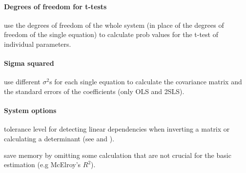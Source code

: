 \paragraph{Degrees of freedom for t-tests}   
 use the degrees of freedom of the whole system
   (in place of the degrees of freedom of the single equation)
   to calculate prob values for the t-test of individual parameters.

\paragraph{Sigma squared}   
 use different $\sigma^2$s for each
   single equation to calculate the covariance matrix and the
   standard errors of the coefficients (only OLS and 2SLS).

\paragraph{System options}   

 tolerance level for detecting linear dependencies
   when inverting a matrix or calculating a determinant (see
    and ).

 save memory by omitting some calculation that
   are not crucial for the basic estimation (e.g McElroy's
   $R^2$).


